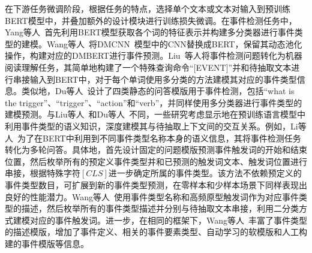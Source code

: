 在下游任务微调阶段，根据任务的特点，选择单个文本或文本对输入到预训练BERT模型中，并叠加额外的设计模块进行训练损失微调。在事件检测任务中，Yang等人~\cite{yang2019exploring}首先利用BERT模型获取各个词的特征表示并构建多分类器进行事件类型的建模。Wang等人~\cite{wang2019adversarial}将DMCNN~\cite{chen2015event}模型中的CNN替换成BERT，保留其动态池化操作，构建对应的DMBERT进行事件预测。Liu~\cite{liu2020event}等人将事件检测问题转化为机器阅读理解任务，其简单地构建了一个特殊查询命令“[EVENT]”并和待抽取文本进行串接输入到BERT中，对于每个单词使用多分类的方法建模其对应的事件类型信息。类似地，Du等人~\cite{du2020event}设计了四类静态的问答模版用于事件检测，包括“what is the trigger”、“trigger”、“action”和“verb”，并同样使用多分类器进行事件类型的建模预测。与Liu等人~\cite{liu2020event}和Du等人~\cite{du2020event}不同，一些研究考虑显示地在预训练语言模型中利用事件类型的语义知识，深度建模其与待抽取上下文间的交互关系。例如，Li等人~\cite{li2020event}为了在BERT中利用到不同事件类型名称本身的语义信息，其将事件检测任务转化为多轮问答。具体地，首先设计固定的问题模版预测事件触发词的开始和结束位置，然后枚举所有的预定义事件类型并和已预测的触发词文本、触发词位置进行串接，根据特殊字符$[CLS]$进一步确定所属的事件类型。该方法不依赖预定义的事件类型数目，可扩展到新的事件类型预测，在零样本和少样本场景下同样表现出良好的性能潜力。Wang等人~\cite{wang2022query}使用事件类型名称和高频原型触发词作为对应事件类型的描述，然后枚举所有的事件类型描述并分别与待抽取文本串接，利用二分类方式建模对应的事件触发词。进一步，在相同的框架下，Wang等人~\cite{wang2022art}丰富了事件类型的描述模版，增加了事件定义、相关的事件要素类型、自动学习的软模版和人工构建的事件模版等信息。

